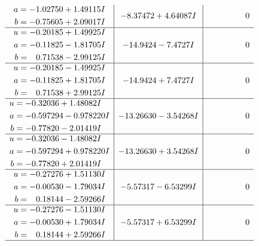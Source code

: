 \documentclass[1p]{elsarticle_modified}
\theoremstyle{definition}
\begin{document}
$$\begin{array}{c|c|c}
\begin{aligned}
a &= -1.02750 + 1.49115 I \\
b &= -0.75605 + 2.09017 I\end{aligned}
 & -8.37472 + 4.64087 I & \phantom{-0.000000 } 0 \\ \hline\begin{aligned}
u &= -0.20185 + 1.49925 I \\
a &= -0.11825 - 1.81705 I \\
b &= \phantom{-}0.71538 - 2.99125 I\end{aligned}
 & -14.9424 - 7.4727 I & \phantom{-0.000000 } 0 \\ \hline\begin{aligned}
u &= -0.20185 - 1.49925 I \\
a &= -0.11825 + 1.81705 I \\
b &= \phantom{-}0.71538 + 2.99125 I\end{aligned}
 & -14.9424 + 7.4727 I & \phantom{-0.000000 } 0 \\ \hline\begin{aligned}
u &= -0.32036 + 1.48082 I \\
a &= -0.597294 - 0.978220 I \\
b &= -0.77820 - 2.01419 I\end{aligned}
 & -13.26630 - 3.54268 I & \phantom{-0.000000 } 0 \\ \hline\begin{aligned}
u &= -0.32036 - 1.48082 I \\
a &= -0.597294 + 0.978220 I \\
b &= -0.77820 + 2.01419 I\end{aligned}
 & -13.26630 + 3.54268 I & \phantom{-0.000000 } 0 \\ \hline\begin{aligned}
u &= -0.27276 + 1.51130 I \\
a &= -0.00530 - 1.79034 I \\
b &= \phantom{-}0.18144 - 2.59266 I\end{aligned}
 & -5.57317 - 6.53299 I & \phantom{-0.000000 } 0 \\ \hline\begin{aligned}
u &= -0.27276 - 1.51130 I \\
a &= -0.00530 + 1.79034 I \\
b &= \phantom{-}0.18144 + 2.59266 I\end{aligned}
 & -5.57317 + 6.53299 I & \phantom{-0.000000 } 0\\
 \hline 
 \end{array}$$\newpage$$\begin{array}{c|c|c}  

\end{array}$$
\end{document}
